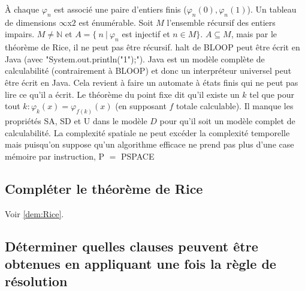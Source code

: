 \begin{mcqs}
  {À chaque $\varphi_n$ est associé une paire d'entiers finis ($\varphi_n(0), \varphi_n(1)$). Un tableau de dimensions $\infty$x$2$ est énumérable.}
  {Soit $M$ l'ensemble récursif des entiers impairs. $M \neq \mathbb{N}$ et $A = \{\ n\ |\ \varphi_n$ est injectif et $n \in M\}$. $A \subseteq M$, mais par le théorème de Rice, il ne peut pas être récursif.}
  {halt de BLOOP peut être écrit en Java (avec "System.out.println("1");"). Java est un modèle complète de calculabilité (contrairement à BLOOP) et donc un interpréteur universel peut être écrit en Java.}
  {Cela revient à faire un automate à états finis qui ne peut pas lire ce qu'il a écrit.}
  {Le théorème du point fixe dit qu'il existe un $k$ tel que pour tout $k : \varphi_k(x) = \varphi_{f(k)}(x)$ (en supposant $f$ totale calculable).}
  {Il manque les propriétés SA, SD et U dans le modèle $D$ pour qu'il soit un modèle complet de calculabilité.}
  {La complexité spatiale ne peut excéder la complexité temporelle mais puisqu'on suppose qu'un algorithme efficace ne prend pas plus d'une case mémoire par instruction, P $=$ PSPACE}
\end{mcqs}

\subsection*{Compléter le théorème de Rice}

Voir \ref{dem:Rice}.

\subsection*{Déterminer quelles clauses peuvent être obtenues en appliquant une fois la règle de résolution}

